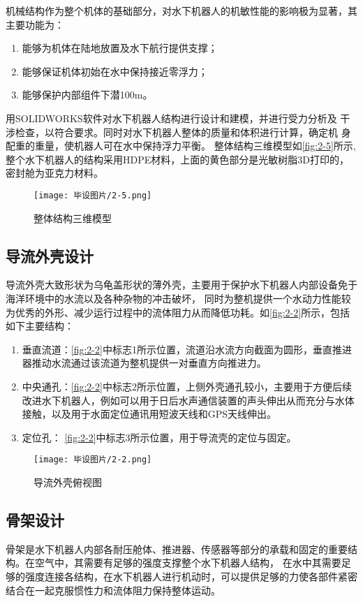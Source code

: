 机械结构作为整个机体的基础部分，对水下机器人的机敏性能的影响极为显著，其主要功能为：
\begin{enumerate}
    \item  能够为机体在陆地放置及水下航行提供支撑；
    \item  能够保证机体初始在水中保持接近零浮力；
    \item  能够保护内部组件下潜100m。
\end{enumerate}


用SOLIDWORKS软件对水下机器人结构进行设计和建模，并进行受力分析及
干涉检查，以符合要求。同时对水下机器人整体的质量和体积进行计算，确定机
身配重的重量，使机器人可在水中保持浮力平衡。
整体结构三维模型如\autoref{fig:2-5}所示,整个水下机器人的结构采用HDPE材料，上面的黄色部分是光敏树脂3D打印的，密封舱为亚克力材料。
\begin{figure}[htbp]
    \centering
    \texttt{[image: 毕设图片/2-5.png]}
    \caption{\label{fig:2-5}整体结构三维模型}
\end{figure}



\subsection{导流外壳设计}

导流外壳大致形状为乌龟盖形状的薄外壳，主要用于保护水下机器人内部设备免于海洋环境中的水流以及各种杂物的冲击破坏，
同时为整机提供一个水动力性能较为优秀的外形、减少运行过程中的流体阻力从而降低功耗。如\autoref{fig:2-2}所示，包括如下主要结构：
\begin{enumerate}
    \item  垂直流道：\autoref{fig:2-2}中标志1所示位置，流道沿水流方向截面为圆形，垂直推进器推动水流通过该流道为整机提供一对垂直方向推进力。
    \item  中央通孔：\autoref{fig:2-2}中标志2所示位置，上侧外壳通孔较小，主要用于方便后续改进水下机器人，例如可以用于日后水声通信装置的声头伸出从而充分与水体接触，以及用于水面定位通讯用短波天线和GPS天线伸出。
    \item  定位孔：  \autoref{fig:2-2}中标志3所示位置，用于导流壳的定位与固定。
\end{enumerate}

\begin{figure}[htbp]
    \centering
    \texttt{[image: 毕设图片/2-2.png]}
    \caption{\label{fig:2-2}导流外壳俯视图}
\end{figure}

\subsection{骨架设计}
骨架是水下机器人内部各耐压舱体、推进器、传感器等部分的承载和固定的重要结构。在空气中，其需要有足够的强度支撑整个水下机器人结构，
在水中其需要足够的强度连接各结构，在水下机器人进行机动时，可以提供足够的力使各部件紧密结合在一起克服惯性力和流体阻力保持整体运动。

